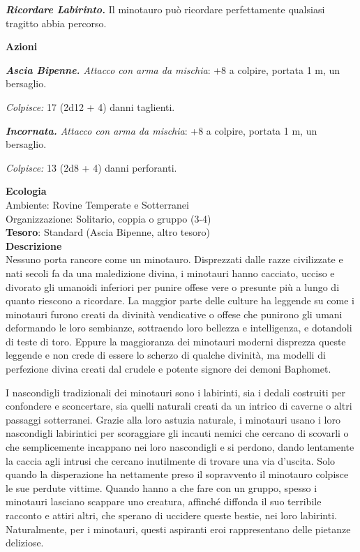 \begin{multicols}{2}
	\textit{\textbf{Ricordare Labirinto.}} Il minotauro può ricordare perfettamente qualsiasi tragitto abbia percorso.

	\textbf{Azioni}

	\textit{\textbf{Ascia Bipenne.} Attacco con arma da mischia}: +8 a colpire, portata 1 m, un bersaglio.

	\textit{Colpisce:} 17 (2d12 + 4) danni taglienti.

	\textit{\textbf{Incornata.} Attacco con arma da mischia}: +8 a colpire, portata 1 m, un bersaglio.

	\textit{Colpisce:} 13 (2d8 + 4) danni perforanti.

	\textbf{Ecologia}\\
	Ambiente: Rovine Temperate e Sotterranei\\
	Organizzazione: Solitario, coppia o gruppo (3-4)\\
	\textbf{Tesoro}: Standard (Ascia Bipenne, altro tesoro)\\
	\textbf{Descrizione}\\
	Nessuno porta rancore come un minotauro. Disprezzati dalle razze civilizzate e nati secoli fa da una maledizione divina, i minotauri hanno cacciato, ucciso e divorato gli umanoidi inferiori per punire offese vere o presunte più a lungo di quanto riescono a ricordare. La maggior parte delle culture ha leggende su come i minotauri furono creati da divinità vendicative o offese che punirono gli umani deformando le loro sembianze, sottraendo loro bellezza e intelligenza, e dotandoli di teste di toro. Eppure la maggioranza dei minotauri moderni disprezza queste leggende e non crede di essere lo scherzo di qualche divinità, ma modelli di perfezione divina creati dal crudele e potente signore dei demoni Baphomet.

	I nascondigli tradizionali dei minotauri sono i labirinti, sia i dedali costruiti per confondere e sconcertare, sia quelli naturali creati da un intrico di caverne o altri passaggi sotterranei. Grazie alla loro astuzia naturale, i minotauri usano i loro nascondigli labirintici per scoraggiare gli incauti nemici che cercano di scovarli o che semplicemente incappano nei loro nascondigli e si perdono, dando lentamente la caccia agli intrusi che cercano inutilmente di trovare una via d'uscita. Solo quando la disperazione ha nettamente preso il sopravvento il minotauro colpisce le sue perdute vittime. Quando hanno a che fare con un gruppo, spesso i minotauri lasciano scappare uno creatura, affinché diffonda il suo terribile racconto e attiri altri, che sperano di uccidere queste bestie, nei loro labirinti. Naturalmente, per i minotauri, questi aspiranti eroi rappresentano delle pietanze deliziose.


\end{multicols}
